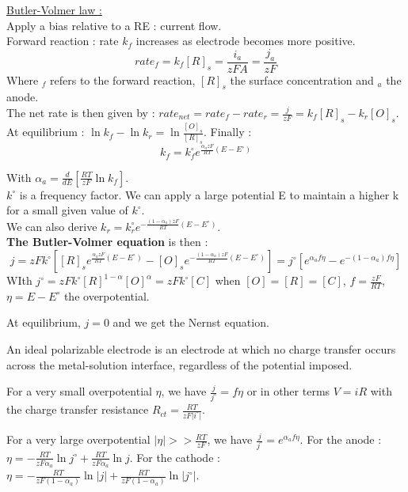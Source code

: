 \documentclass[../main.tex]{subfiles}
\begin{document}
\quad \underline{Butler-Volmer law :}\\
Apply a bias relative to a RE : current flow.\\

Forward reaction : rate $k_f$ increases as electrode becomes more positive.\\
\begin{equation}
    rate_f = k_f [R]_s = \frac{i_a}{zFA} = \frac{j_a}{zF}
\end{equation}
Where ${}_f$ refers to the forward reaction, $[R]_s$ the surface concentration and ${}_a$ the anode.\\

The net rate is then given by : $rate_{net} = rate_f - rate_r = \frac{j}{zF} = k_f [R]_s - k_r [O]_s$.
At equilibrium : $\ln k_f - \ln k_r = \ln \frac{[O]_s}{[R]_s}$. Finally : \begin{equation}
    k_f = k_f^\circ e^{\frac{\alpha_a zF}{RT} (E-E^\circ)}
\end{equation}

With $\alpha_a = \frac{d}{dE} [\frac{RT}{zF} \ln k_f]$.\\

$k^\circ$ is a frequency factor. We can apply a large potential E to maintain a higher k for a small given value of $k^\circ$. \\
We can also derive $k_r = k_r^\circ e^{-\frac{(1-\alpha_a) zF}{RT}(E-E^\circ)}$.\\

\textbf{The Butler-Volmer equation} is then : \begin{equation}
    j = zFk^\circ [[R]_s e^{\frac{\alpha_a zF}{RT}(E-E^\circ)} - [O]_s e^{-\frac{(1-\alpha_a)zF}{RT}(E-E^\circ)}] = j^\circ [e^{\alpha_a f \eta} - e^{-(1-\alpha_a) f \eta}]
\end{equation}
WIth $j^\circ = zF k^\circ [R]^{1-\alpha} [O]^\alpha = zFk^\circ [C]$ when $[O] = [R] = [C]$, $f= \frac{zF}{RT}$, $\eta = E - E^\circ$ the overpotential.

At equilibrium, $j=0$ and we get the Nernst equation. 

An ideal polarizable electrode is an electrode at which no charge transfer occurs across the metal-solution interface, regardless of the potential imposed.


For a very small overpotential $\eta$, we have $\frac{j}{j^\circ} = f\eta$ or in other terms $V = iR$ with the charge transfer resistance $R_{ct} = \frac{RT}{zF \lvert i^\circ \rvert}$.

For a very large overpotential $\lvert \eta \rvert >> \frac{RT}{zF}$, we have $\frac{j}{j^\circ} = e^{\alpha_a f \eta}$. For the anode : $\eta = -\frac{RT}{zF\alpha_a} \ln j^\circ + \frac{RT}{zF\alpha_a} \ln j$. For the cathode : $\eta = -\frac{RT}{zF(1-\alpha_a)} \ln \lvert j \rvert + \frac{RT}{zF(1-\alpha_a)} \ln \lvert j^\circ \rvert$.\\
\end{document}
